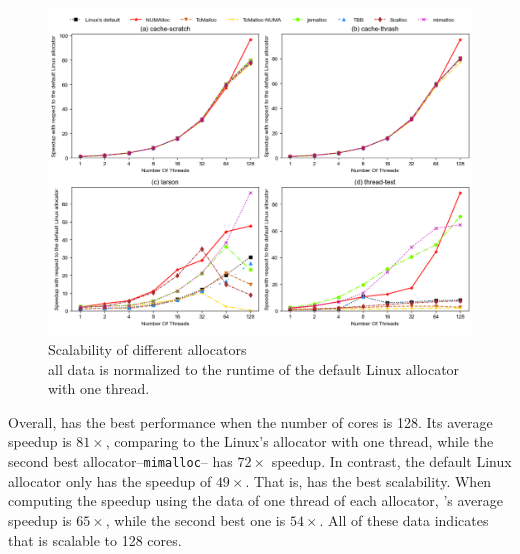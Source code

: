 \begin{figure}[!th]
    \centering
    \includegraphics[width=\textwidth]{figure/sythentic-scalobility.pdf}
    \caption{Scalability of different allocators\\ all data is normalized to the runtime of the default Linux allocator with one thread.}
    \label{sythentic-scalability}
\end{figure}

Overall, \NM{} has the best performance when the number of cores is 128. Its average speedup is $81\times$, comparing to the Linux's allocator with one thread, while the second best allocator--\texttt{mimalloc}-- has $72\times$ speedup. In contrast, the default Linux allocator only has the speedup of $49\times$. That is, \NM{} has the best scalability. When computing the speedup using the data of one thread of each allocator, \NM{}'s average speedup is $65\times$, while the second best one is $54\times$. All of these data indicates that \NM{} is scalable to 128 cores. 





